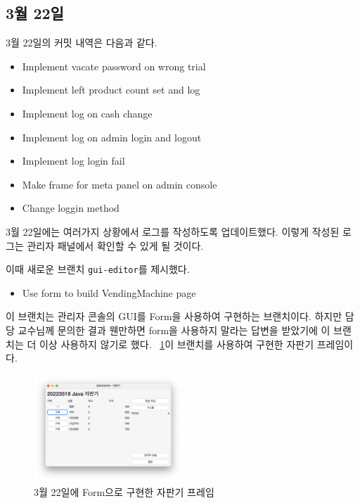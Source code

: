\documentclass{oblivoir}
\newcommand{\figref}[1]{\figurename~\ref{#1}}
\begin{document}
    \subsection{3월 22일}

    3월 22일의 커밋 내역은 다음과 같다.
    \begin{itemize}
        \item Implement vacate password on wrong trial
        \item Implement left product count set and log
        \item Implement log on cash change
        \item Implement log on admin login and logout
        \item Implement log login fail
        \item Make frame for meta panel on admin console
        \item Change loggin method
    \end{itemize}

    3월 22일에는 여러가지 상황에서 로그를 작성하도록 업데이트했다.
    이렇게 작성된 로그는 관리자 패널에서 확인할 수 있게 될 것이다.

    이때 새로운 브랜치 \texttt{gui-editor}를 제시했다.

    \begin{itemize}
        \item Use form to build VendingMachine page
    \end{itemize}

    이 브랜치는 관리자 콘솔의 GUI를 Form을 사용하여 구현하는 브랜치이다.
    하지만 담당 교수님께 문의한 결과 웬만하면 form을 사용하지 말라는 답변을 받았기에
    이 브랜치는 더 이상 사용하지 않기로 했다.
    \figref{fig:0322-vending-machine}\은 이 브랜치를 사용하여 구현한 자판기 프레임이다.
    \begin{figure}[h]
        \centering
        \includegraphics[width=0.5\textwidth]{0322-vending-machine}
        \caption{3월 22일에 Form으로 구현한 자판기 프레임}
        \label{fig:0322-vending-machine}
    \end{figure}
\end{document}
